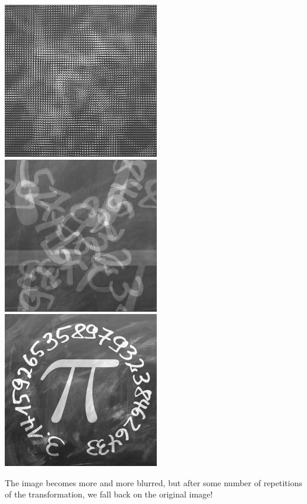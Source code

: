 \documentclass[11pt,class=report,crop=false]{standalone}
\begin{document}
\begin{cours}
\begin{center}
\includegraphics[scale=\myscale,scale=0.3]{images_chapter/pi_gimp_new_photo_6.png}\qquad
\includegraphics[scale=\myscale,scale=0.3]{images_chapter/pi_gimp_new_photo_7.png}\qquad
\includegraphics[scale=\myscale,scale=0.3]{images_chapter/pi_gimp_new_photo_8.png}
\end{center}
The image becomes more and more blurred, but after some number of repetitions of the transformation, we fall back on the original image!
\end{cours}




\end{document}
